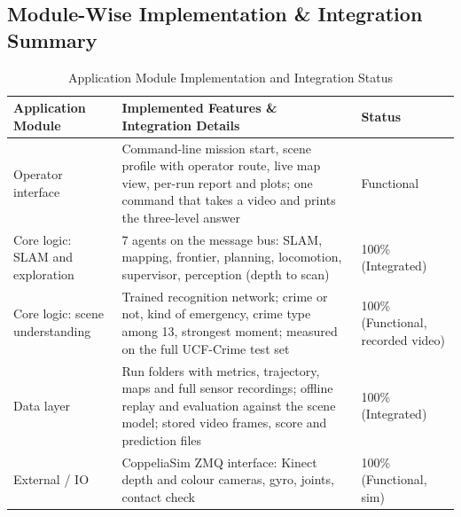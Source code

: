 \documentclass[11pt, a4paper]{article}
\begin{document}
\subsection{Module-Wise Implementation \& Integration Summary}
\begin{table}[H]
    \centering
    \footnotesize
    \renewcommand{\arraystretch}{1.25}
    \begin{tabular}{|p{3.5cm}|p{7.8cm}|p{2.9cm}|}
        \hline
        \textbf{Application Module} & \textbf{Implemented Features \& Integration Details} & \textbf{Status} \\
        \hline
        Operator interface & Command-line mission start, scene profile with operator route, live map view, per-run report and plots; one command that takes a video and prints the three-level answer & Functional \\
        \hline
        Core logic: SLAM and exploration & 7 agents on the message bus: SLAM, mapping, frontier, planning, locomotion, supervisor, perception (depth to scan) & 100\% (Integrated) \\
        \hline
        Core logic: scene understanding & Trained recognition network; crime or not, kind of emergency, crime type among 13, strongest moment; measured on the full UCF-Crime test set & 100\% (Functional, recorded video) \\
        \hline
        Data layer & Run folders with metrics, trajectory, maps and full sensor recordings; offline replay and evaluation against the scene model; stored video frames, score and prediction files & 100\% (Integrated) \\
        \hline
        External / IO & CoppeliaSim ZMQ interface: Kinect depth and colour cameras, gyro, joints, contact check & 100\% (Functional, sim) \\
        \hline
    \end{tabular}
    \caption{Application Module Implementation and Integration Status}
\end{table}
\end{document}
